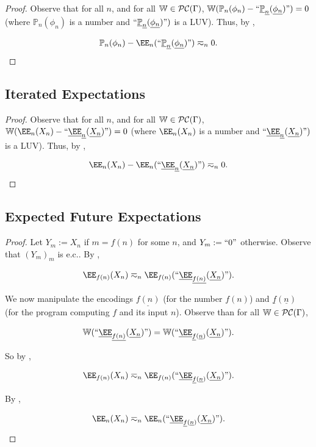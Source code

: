 \documentclass[authordate,onecolumn,noenvironments]{miri-tech-article}
\numberwithin{equation}{subsection}
\newcommand{\quot}[1]{``#1"}
\newcommand{\enc}[1]{{\underline{#1}}}
\newcommand{\ec}[1][\ ]{e.c.#1}
\newcommand{\BelState}{\mathbb{P}}
\newcommand{\pt}{\BelState}
\newcommand{\cworlds}{\mathcal{P\-C}} %
\newcommand{\World}{\mathbb{W}}
\newcommand{\Theory}{\Gamma}
\begin{document}
\restateepr*

\begin{proof}

  Observe that for all $n$, and for all $\World \in \cworlds(\Theory)$, $\World(\pt_n(\phi_n) - \quot{\enc{\pt}_\enc{n}(\enc{\phi_n})}) = 0$ (where $\pt_n(\phi_n)$ is a number and $ \quot{\enc{\pt}_\enc{n}(\enc{\phi_n})})$ is a LUV).  Thus, by ,

  \[ \pt_n(\phi_n) - \EE_n(\quot{\enc{\pt}_\enc{n}(\enc{\phi_n})}) \eqsim_n 0. \]
\end{proof}

\subsection{Iterated Expectations}\label{app:er}

\restateer*

\begin{proof}
  Observe that for all $n$, and for all $\World \in \cworlds(\Theory)$, $\World(\EE_n(X_n)- \quot{\enc{\EE}_\enc{n}(\enc{X_n})}) = 0$ (where $\EE_n(X_n)$ is a number and $ \quot{\enc{\EE}_\enc{n}(\enc{X_n})})$ is a LUV).  Thus, by ,

  \[ \EE_n(X_n) - \EE_n(\quot{\enc{\EE}_\enc{n}(\enc{X_n})}) \eqsim_n 0.\]

\end{proof}


\subsection{Expected Future Expectations}\label{app:cee}

\restatecee*

\begin{proof}

  Let $Y_m := X_n$ if $m = f(n)$ for some $n$, and $Y_m := \quot{0}$ otherwise.  Observe that $(Y_m)_m$ is \ec[].  By ,

  \[ \EE_{f(n)}(X_n) \eqsim_n \EE_{f(n)}( \quot{ \enc{\EE}_{\enc{f(n)} } (\enc{X_n})}  ). \]

  We now manipulate the encodings $\enc{f(n)}$ (for the number $f(n)$) and $\enc{f}(\enc{n})$ (for the program computing $f$ and its input $n$). Observe than for all $\World \in \cworlds(\Theory)$, 

  \[ \World ( \quot{ \enc{\EE}_{\enc{f(n)} } (\enc{X_n})}  ) = 
  \World ( \quot{ \enc{\EE}_{\enc{f}(\enc{n}) } (\enc{X_n})}  ). \]

  So by ,

  \[ \EE_{f(n)}(X_n) \eqsim_n \EE_{f(n)}( \quot{ \enc{\EE}_{\enc{f}(\enc{n}) } (\enc{X_n})}). \]

  By ,

  \[ \EE_n(X_n) \eqsim_n \EE_n(\quot{ \enc{\EE}_{\enc{f}(\enc{n}) } (\enc{X_n}) }).  \]
\end{proof}
\end{document}
